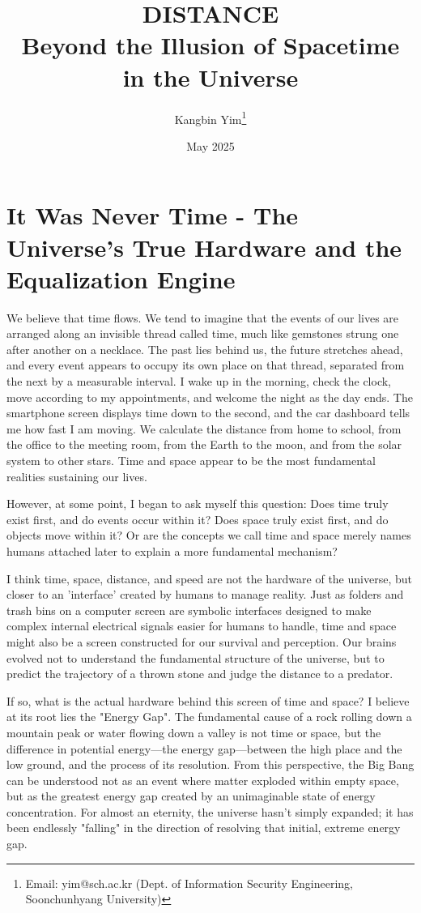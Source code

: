 \documentclass[11pt,a4paper]{article}
\title{\textbf{DISTANCE}\\ \Large Beyond the Illusion of Spacetime in the Universe}
\author{Kangbin Yim\thanks{Email: yim@sch.ac.kr (Dept. of Information Security Engineering, Soonchunhyang University)}}
\date{May 2025}
\begin{document}
\maketitle

\section*{It Was Never Time - The Universe's True Hardware and the Equalization Engine}
We believe that time flows. We tend to imagine that the events of our lives are arranged along an invisible thread called time, much like gemstones strung one after another on a necklace. The past lies behind us, the future stretches ahead, and every event appears to occupy its own place on that thread, separated from the next by a measurable interval. I wake up in the morning, check the clock, move according to my appointments, and welcome the night as the day ends. The smartphone screen displays time down to the second, and the car dashboard tells me how fast I am moving. We calculate the distance from home to school, from the office to the meeting room, from the Earth to the moon, and from the solar system to other stars. Time and space appear to be the most fundamental realities sustaining our lives.

However, at some point, I began to ask myself this question: Does time truly exist first, and do events occur within it? Does space truly exist first, and do objects move within it? Or are the concepts we call time and space merely names humans attached later to explain a more fundamental mechanism?

I think time, space, distance, and speed are not the hardware of the universe, but closer to an 'interface' created by humans to manage reality. Just as folders and trash bins on a computer screen are symbolic interfaces designed to make complex internal electrical signals easier for humans to handle, time and space might also be a screen constructed for our survival and perception. Our brains evolved not to understand the fundamental structure of the universe, but to predict the trajectory of a thrown stone and judge the distance to a predator.

If so, what is the actual hardware behind this screen of time and space? I believe at its root lies the "Energy Gap". The fundamental cause of a rock rolling down a mountain peak or water flowing down a valley is not time or space, but the difference in potential energy—the energy gap—between the high place and the low ground, and the process of its resolution. From this perspective, the Big Bang can be understood not as an event where matter exploded within empty space, but as the greatest energy gap created by an unimaginable state of energy concentration. For almost an eternity, the universe hasn't simply expanded; it has been endlessly "falling" in the direction of resolving that initial, extreme energy gap.
\end{document}
